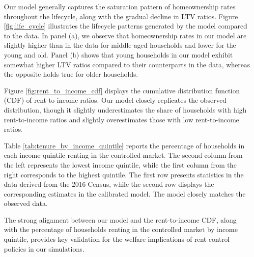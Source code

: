 \documentclass[parskip=full]{article}
\begin{document}
Our model generally captures the saturation pattern of homeownership rates throughout the lifecycle, along with the gradual decline in LTV ratios. Figure \ref{fig:life_cycle} illustrates the lifecycle patterns generated by the model compared to the data. In panel (a), we observe that homeownership rates in our model are slightly higher than in the data for middle-aged households and lower for the young and old. Panel (b) shows that young households in our model exhibit somewhat higher LTV ratios compared to their counterparts in the data, whereas the opposite holds true for older households.

Figure \ref{fig:rent_to_income_cdf} displays the cumulative distribution function (CDF) of rent-to-income ratios. Our model closely replicates the observed distribution, though it slightly underestimates the share of households with high rent-to-income ratios and slightly overestimates those with low rent-to-income ratios.

Table \ref{tab:tenure_by_income_quintile} reports the percentage of households in each income quintile renting in the controlled market. The second column from the left represents the lowest income quintile, while the first column from the right corresponds to the highest quintile. The first row presents statistics in the data derived from the 2016 Census, while the second row displays the corresponding estimates in the calibrated model. The model closely matches the observed data. 

The strong alignment between our model and the rent-to-income CDF, along with the percentage of households renting in the controlled market by income quintile, provides key validation for the welfare implications of rent control policies in our simulations.

\end{document}

